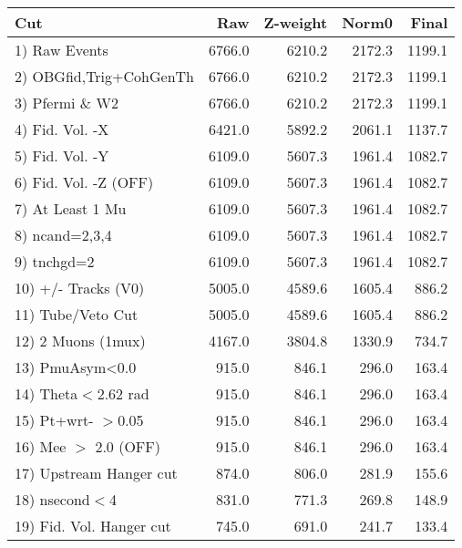  \begin{table}[h!]\centering
 \begin{tabular}{||l||r|r|r|r||}
 \hline
 \hline
 Cut & Raw & Z-weight & Norm0 & Final \\
 \hline
  1) Raw Events           &      6766.0 &      6210.2 &      2172.3 &      1199.1 \\
  2) OBGfid,Trig+CohGenTh &      6766.0 &      6210.2 &      2172.3 &      1199.1 \\
  3) Pfermi \& W2         &      6766.0 &      6210.2 &      2172.3 &      1199.1 \\
  4) Fid. Vol. -X         &      6421.0 &      5892.2 &      2061.1 &      1137.7 \\
  5) Fid. Vol. -Y         &      6109.0 &      5607.3 &      1961.4 &      1082.7 \\
  6) Fid. Vol. -Z (OFF)   &      6109.0 &      5607.3 &      1961.4 &      1082.7 \\
  7) At Least 1 Mu        &      6109.0 &      5607.3 &      1961.4 &      1082.7 \\
  8) ncand=2,3,4          &      6109.0 &      5607.3 &      1961.4 &      1082.7 \\
  9) tnchgd=2             &      6109.0 &      5607.3 &      1961.4 &      1082.7 \\
 10) +/- Tracks (V0)      &      5005.0 &      4589.6 &      1605.4 &       886.2 \\
 11) Tube/Veto Cut        &      5005.0 &      4589.6 &      1605.4 &       886.2 \\
 12) 2 Muons (1mux)       &      4167.0 &      3804.8 &      1330.9 &       734.7 \\
 13) PmuAsym<0.0          &       915.0 &       846.1 &       296.0 &       163.4 \\
 14) Theta$<$2.62 rad     &       915.0 &       846.1 &       296.0 &       163.4 \\
 15) Pt+wrt- $>$0.05      &       915.0 &       846.1 &       296.0 &       163.4 \\
 16) Mee $>$ 2.0  (OFF)   &       915.0 &       846.1 &       296.0 &       163.4 \\
 17) Upstream Hanger cut  &       874.0 &       806.0 &       281.9 &       155.6 \\
 18) nsecond$<$4          &       831.0 &       771.3 &       269.8 &       148.9 \\
 19) Fid. Vol. Hanger cut &       745.0 &       691.0 &       241.7 &       133.4 \\

\end{tabular}
\end{table}
